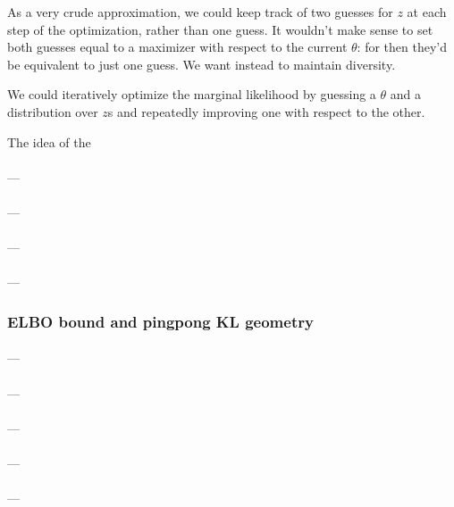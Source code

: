 \documentclass[12pt]{article}
\begin{document}
          As a very crude approximation, we could keep track of two guesses for
          $z$ at each step of the optimization, rather than one guess.  It
          wouldn't make sense to set both guesses equal to a maximizer with
          respect to the current $\theta$: for then they'd be equivalent to
          just one guess.  We want instead to maintain diversity.

          We could iteratively optimize the marginal likelihood by guessing
          a $\theta$ and a distribution over $z$s and repeatedly improving
          one with respect to the other.

          The idea of the 
        \paragraph{\sf} --- 
        \paragraph{\sf} --- 
        \paragraph{\sf} --- 
        \paragraph{\sf} --- 

      \subsubsection*{ELBO bound and pingpong KL geometry}
        \paragraph{\sf} --- 
        \paragraph{\sf} --- 
        \paragraph{\sf} --- 
        \paragraph{\sf} --- 
        \paragraph{\sf} --- 
\end{document}

